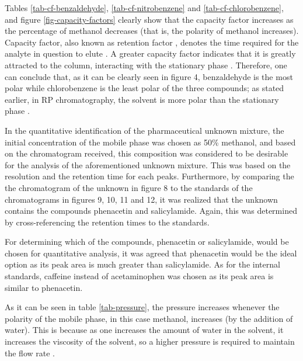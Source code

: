 \documentclass[a4paper, 12pt]{article}
\begin{document}
Tables \ref{tab-cf-benzaldehyde}, \ref{tab-cf-nitrobenzene} and \ref{tab-cf-chlorobenzene}, and figure \ref{fig-capacity-factors} clearly show that the capacity factor increases as the percentage of methanol decreases (that is, the polarity of methanol increases). Capacity factor, also known as retention factor \cite{harris}, denotes the time required for the analyte in question to elute \cite{harris}. A greater capacity factor indicates that it is greatly attracted to the column, interacting with the stationary phase \cite{harris}. Therefore, one can conclude that, as it can be clearly seen in figure 4, benzaldehyde is the most polar while chlorobenzene is the least polar of the three compounds; as stated earlier, in RP chromatography, the solvent is more polar than the stationary phase \cite{harris}.

In the quantitative identification of the pharmaceutical unknown mixture, the initial concentration of the mobile phase was chosen as 50\% methanol, and based on the chromatogram received, this composition was considered to be desirable for the analysis of the aforementioned unknown mixture. This was based on the resolution and the retention time for each peaks. Furthermore, by comparing the the chromatogram of the unknown in figure 8 to the standards of the chromatograms in figures 9, 10, 11 and 12, it was realized that the unknown contains the compounds phenacetin and salicylamide. Again, this was determined by cross-referencing the retention times to the standards.

For determining which of the compounds, phenacetin or salicylamide, would be chosen for quantitative analysis, it was agreed that phenacetin would be the ideal option as its peak area is much greater than salicylamide. As for the internal standards, caffeine instead of acetaminophen was chosen as its peak area is similar to phenacetin.

As it can be seen in table \ref{tab-pressure}, the pressure increases whenever the polarity of the mobile phase, in this case methanol, increases (by the addition of water). This is because as one increases the amount of water in the solvent, it increases the viscosity of the solvent, so a higher pressure is required to maintain the flow rate \cite{harris}.

\end{document}
